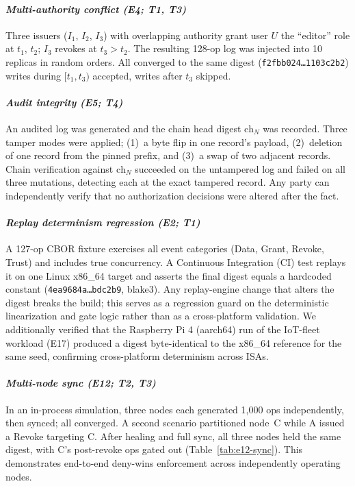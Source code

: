 \documentclass[10pt,journal,compsoc]{IEEEtran}
\begin{document}
\paragraph*{\textbf{\textit{Multi-authority conflict (E4; T1, T3)}}}
Three issuers ($I_1$, $I_2$, $I_3$) with overlapping authority grant user $U$ the ``editor'' role at $t_1$, $t_2$; $I_3$ revokes at $t_3>t_2$. The resulting 128-op log was injected into 10 replicas in random orders. All converged to the same digest (\texttt{\small f2fbb024\ldots 1103c2b2}) writes during $[t_1,t_3)$ accepted, writes after $t_3$ skipped.

\paragraph*{\textbf{\textit{Audit integrity (E5; T4)}}}
An audited log was generated and the chain head digest $\mathrm{ch}_N$ was recorded. Three tamper modes were applied; (1)~a byte flip in one record's payload, (2)~deletion of one record from the pinned prefix, and (3)~a swap of two adjacent records. Chain verification against $\mathrm{ch}_N$ succeeded on the untampered log and failed on all three mutations, detecting each at the exact tampered record. Any party can independently verify that no authorization decisions were altered after the fact.

\paragraph*{\textbf{\textit{Replay determinism regression (E2; T1)}}}
A 127-op CBOR fixture exercises all event categories (Data, Grant, Revoke, Trust) and includes true concurrency. A Continuous Integration (CI) test replays it on one Linux x86\_64 target and asserts the final digest equals a hardcoded constant (\texttt{\small 4ea9684a\ldots bdc2b9}, blake3). Any replay-engine change that alters the digest breaks the build; this serves as a regression guard on the deterministic linearization and gate logic rather than as a cross-platform validation. We additionally verified that the Raspberry Pi 4 (aarch64) run of the IoT-fleet workload (E17) produced a digest byte-identical to the x86\_64 reference for the same seed, confirming cross-platform determinism across ISAs.

\paragraph*{\textbf{\textit{Multi-node sync (E12; T2, T3)}}}
In an in-process simulation, three nodes each generated 1{,}000 ops independently, then synced; all converged. A second scenario partitioned node~C while A issued a Revoke targeting C. After healing and full sync, all three nodes held the same digest, with C's post-revoke ops gated out (Table~\ref{tab:e12-sync}). This demonstrates end-to-end deny-wins enforcement across independently operating nodes.
\end{document}
